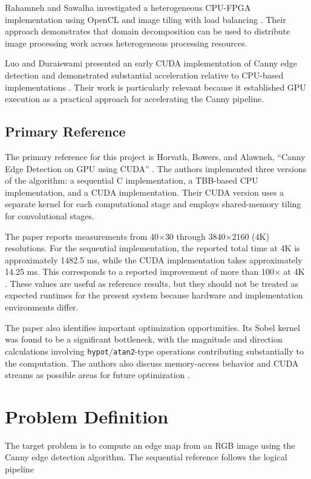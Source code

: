 \documentclass[conference]{IEEEtran}
\begin{document}
Rahamneh and Sawalha investigated a heterogeneous CPU-FPGA implementation
using OpenCL and image tiling with load balancing \cite{rahamneh2019}.
Their approach demonstrates that domain decomposition can be used to
distribute image processing work across heterogeneous processing resources.

Luo and Duraiswami presented an early CUDA implementation of Canny edge
detection and demonstrated substantial acceleration relative to CPU-based
implementations \cite{luo2008}. Their work is particularly relevant because
it established GPU execution as a practical approach for accelerating the
Canny pipeline.

\subsection{Primary Reference}

The primary reference for this project is Horvath, Bowers, and Alawneh,
``Canny Edge Detection on GPU using CUDA'' \cite{horvath2023}. The authors
implemented three versions of the algorithm: a sequential C implementation,
a TBB-based CPU implementation, and a CUDA implementation. Their CUDA version
uses a separate kernel for each computational stage and employs shared-memory
tiling for convolutional stages.

The paper reports measurements from 40$\times$30 through 3840$\times$2160
(4K) resolutions. For the sequential implementation, the reported total
time at 4K is approximately 1482.5 ms, while the CUDA implementation takes
approximately 14.25 ms. This corresponds to a reported improvement of more
than 100$\times$ at 4K \cite{horvath2023}. These values are useful as
reference results, but they should not be treated as expected runtimes for
the present system because hardware and implementation environments differ.

The paper also identifies important optimization opportunities. Its Sobel
kernel was found to be a significant bottleneck, with the magnitude and
direction calculations involving \texttt{hypot}/\texttt{atan2}-type
operations contributing substantially to the computation. The authors also
discuss memory-access behavior and CUDA streams as possible areas for future
optimization \cite{horvath2023}.

\section{Problem Definition}

The target problem is to compute an edge map from an RGB image using the
Canny edge detection algorithm. The sequential reference follows the
logical pipeline
\end{document}
